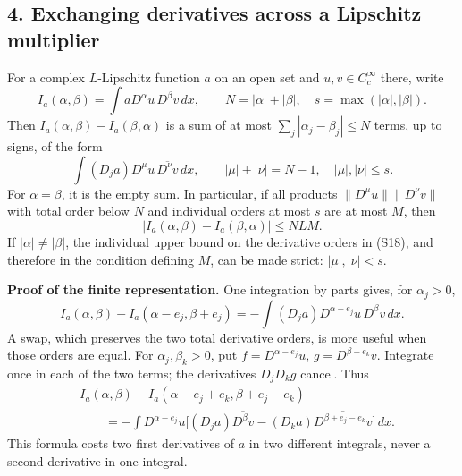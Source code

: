 \documentclass[
  11pt,
]{article}
\makeatletter
\let\ReaderOriginalAnchorStart\hyper@anchorstart
\let\ReaderOriginalAnchorEnd\hyper@anchorend
\let\ReaderPendingAliases\@empty
\def\ReaderArmAliases#1{\gdef\ReaderPendingAliases{#1}}
\def\hyper@anchorstart#1{\ReaderIfNativeAnchorTF{#1}{\ReaderPendingAliases\global\let\ReaderPendingAliases\@empty}{}\ReaderOriginalAnchorStart{#1}}
\makeatother
\begin{document}
\ReaderArmAliases{\ReaderOriginalAnchorStart{AN03-SUC-004}\ReaderOriginalAnchorEnd\begingroup\expandafter\def\csname @currentHref\endcsname{AN03-SUC-004}\label{AN03-SUC-004}\endgroup\ReaderOriginalAnchorStart{an03-suc-004-exchanging-derivatives-across-a-lipschitz-multiplier}\ReaderOriginalAnchorEnd\begingroup\expandafter\def\csname @currentHref\endcsname{an03-suc-004-exchanging-derivatives-across-a-lipschitz-multiplier}\label{an03-suc-004-exchanging-derivatives-across-a-lipschitz-multiplier}\endgroup\ReaderOriginalAnchorStart{4-exchanging-derivatives-across-a-lipschitz-multiplier}\ReaderOriginalAnchorEnd\begingroup\expandafter\def\csname @currentHref\endcsname{4-exchanging-derivatives-across-a-lipschitz-multiplier}\label{4-exchanging-derivatives-across-a-lipschitz-multiplier}\endgroup\ReaderOriginalAnchorStart{exchanging-derivatives-across-a-lipschitz-multiplier}\ReaderOriginalAnchorEnd}
\subsection{4. Exchanging derivatives across a Lipschitz
multiplier}\label{exchanging-derivatives-across-a-lipschitz-multiplier}

For a complex \(L\)-Lipschitz function \(a\) on an open set and
\(u,v\in C_c^\infty\) there, write \[
 I_a(\alpha,\beta)=\int aD^\alpha u\,\overline{D^\beta v}\,dx,
 \qquad N=|\alpha|+|\beta|,\quad s=\max(|\alpha|,|\beta|).
\] Then \(I_a(\alpha,\beta)-I_a(\beta,\alpha)\) is a sum of at most
\(\sum_j|\alpha_j-\beta_j|\leq N\) terms, up to signs, of the form \[
 \int (D_ja)D^\mu u\,\overline{D^\nu v}\,dx,\qquad
 |\mu|+|\nu|=N-1,\quad |\mu|,|\nu|\leq s.                          \tag{S18}
\] For \(\alpha=\beta\), it is the empty sum. In particular, if all
products \(\|D^\mu u\|\|D^\nu v\|\) with total order below \(N\) and
individual orders at most \(s\) are at most \(M\), then \[
 |I_a(\alpha,\beta)-I_a(\beta,\alpha)|\leq NLM.                    \tag{S19}
\] If \(|\alpha|\ne|\beta|\), the individual upper bound on the
derivative orders in (S18), and therefore in the condition defining
\(M\), can be made strict: \(|\mu|,|\nu|<s\).

\textbf{Proof of the finite representation.} One integration by parts
gives, for \(\alpha_j>0\), \[
 I_a(\alpha,\beta)-I_a(\alpha-e_j,\beta+e_j)
   =-\int(D_ja)D^{\alpha-e_j}u\,\overline{D^\beta v}\,dx.          \tag{S20}
\] A swap, which preserves the two total derivative orders, is more
useful when those orders are equal. For \(\alpha_j,\beta_k>0\), put
\(f=D^{\alpha-e_j}u\), \(g=D^{\beta-e_k}v\). Integrate once in each of
the two terms; the derivatives \(D_jD_kg\) cancel. Thus \[
\begin{split}
 &I_a(\alpha,\beta)-I_a(\alpha-e_j+e_k,\beta+e_j-e_k)\\
 &\qquad=-\int D^{\alpha-e_j}u\bigl[
 (D_ja)\overline{D^\beta v}
 -(D_ka)\overline{D^{\beta+e_j-e_k}v}\bigr]\,dx.
\end{split}                                                       \tag{S21}
\] This formula costs two first derivatives of \(a\) in two different
integrals, never a second derivative in one integral.
\end{document}
